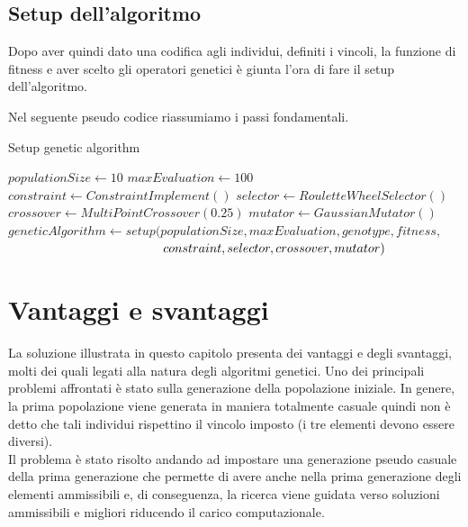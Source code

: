 \documentclass[a4paper, 11pt, oneside]{report}
\begin{document}
                \subsection{Setup dell'algoritmo}
                Dopo aver quindi dato una codifica agli individui, definiti i vincoli, la funzione di fitness e aver
                scelto gli operatori genetici è giunta l'ora di fare il setup dell'algoritmo.
                \par \noindent Nel seguente pseudo codice riassumiamo i passi fondamentali.
                \medskip
                \begin{algorithm}
                \caption{Setup genetic algorithm}
                    \label{setup:ga}
                    \begin{algorithmic}[1]
                        \State $populationSize \gets 10$
                        \State $maxEvaluation \gets 100$
                        \State
                        \State $constraint \gets ConstraintImplement()$
                        \State $selector \gets RouletteWheelSelector()$
                        \State $crossover \gets MultiPointCrossover(0.25)$
                        \State $mutator \gets GaussianMutator()$
                        \State
                        \State $geneticAlgorithm \gets setup(populationSize, maxEvaluation, genotype, fitness,$
                        \State $\hspace*{12.3em} constraint, selector, crossover, mutator)$
                    \end{algorithmic}
                \end{algorithm}

            \section{Vantaggi e svantaggi}
            La soluzione illustrata in questo capitolo presenta dei vantaggi e degli svantaggi, molti dei quali legati
            alla natura degli algoritmi genetici.
            Uno dei principali problemi affrontati è stato sulla generazione della popolazione iniziale.
            In genere, la prima popolazione viene generata in maniera totalmente casuale quindi non è detto che
            tali individui rispettino il vincolo imposto (i tre elementi devono essere diversi).\\
            Il problema è stato risolto andando ad impostare una generazione pseudo casuale della prima generazione che permette
            di avere anche nella prima generazione degli elementi ammissibili e, di conseguenza,
            la ricerca viene guidata verso soluzioni ammissibili e migliori riducendo il carico computazionale.\\
\end{document}
